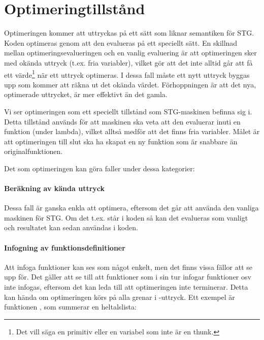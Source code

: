\documentclass[Rapport]{subfiles}
\begin{document}
\section{Optimeringtillstånd}


Optimeringen kommer att uttryckas på ett sätt som liknar semantiken för STG. Koden optimeras
 genom att den evalueras på ett speciellt sätt. En skillnad mellan optimeringsevalueringen och en vanlig
evaluering är att optimeringen sker med okända uttryck (t.ex. fria variabler), 
vilket gör att det inte alltid går att få ett värde\footnote{ Det vill säga en primitiv eller en variabel som inte
är en thunk.}  när ett uttryck optimeras. I dessa
fall måste ett nytt uttryck byggas upp som kommer att räkna ut det okända värdet. 
Förhoppningen är att det nya, optimerade uttrycket, är mer effektivt än det gamla.

Vi ser optimeringen som ett speciellt tillstånd som STG-maskinen befinna sig i. 
Detta tillstånd används för att maskinen ska veta att den evaluerar inuti en funktion
(under lambda), vilket alltså medför att det finns fria variabler. 
Målet är att optimeringen till slut ska ha skapat en ny funktion som är snabbare 
än originalfunktionen.

Det som optimeringen kan göra faller under dessa kategorier:

\paragraph{ Beräkning av kända uttryck }
Dessa fall är ganska enkla att optimera, eftersom det går att använda den vanliga
maskinen för STG. Om det t.ex. står  i koden så kan det evalueras
som vanligt och resultatet  kan sedan användas i koden.

\paragraph{ Infogning av funktionsdefinitioner }

Att infoga funktioner kan ses som något enkelt, men det finns vissa fällor att se upp
för. Det gäller att se till att funktioner som i sin tur infogar funktioner osv inte infogas,
eftersom det kan leda till att optimeringen inte terminerar. Detta kan hända om optimeringen körs på alla grenar
i -uttryck. Ett exempel är funktionen , som summerar en heltalslista:
\end{document}
